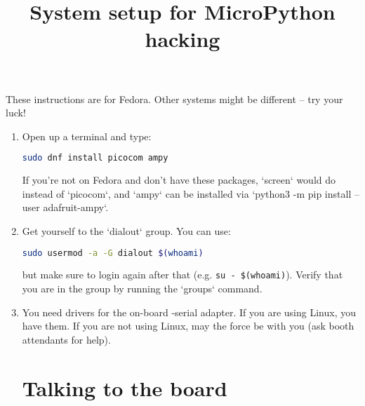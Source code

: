 \documentclass{../tutorial}
\title{System setup for MicroPython \abbr{ESP32} hacking}
\begin{document}
These instructions are for Fedora.
Other systems might be different – try your luck!

\begin{enumerate}

\section{Installation}

\item
    Open up a terminal and type:

    \begin{lstlisting}[language=bash]
    sudo dnf install picocom ampy
    \end{lstlisting}

    If you're not on Fedora and don't have these packages,
    `screen` would do instead of `picocom`,
    and `ampy` can be installed via
    `python3 -m pip install --user adafruit-ampy`.

\item
    Get yourself to the `dialout` group.
    You can use:

    \begin{lstlisting}[language=bash]
    sudo usermod -a -G dialout $(whoami)
    \end{lstlisting}

    but make sure to login again after that
    (e.g. \lstinline|su - $(whoami)|).
    Verify that you are in the group by running the `groups` command.

    \begin{comment}
        The `dialout` group is historically designed for modems
        and gives you full and direct access to serial ports.
    \end{comment}

\item
    You need drivers for the on-board  -serial adapter.
    If you are using Linux, you have them.
    If you are not using Linux, may the force be with you
    (ask booth attendants for help).

\section{Talking to the board}

    \begin{comment}
        To protect delicate pins and make connections easier,
        the black \abbr{ESP32} devkit is plugged into a white OctopusLab Robot~Board.
        Please ask if you want to unplug it.
    \end{comment}


\end{enumerate}
\end{document}
